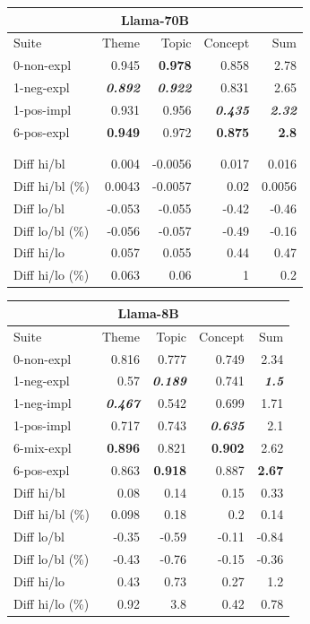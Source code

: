 \begin{table}
    \centering
    \scriptsize
    \begin{tabular}{lrrrr}
    \toprule
    \multicolumn{5}{c}{\textbf{Llama-70B}} \\
    \midrule
    Suite & Theme & Topic & Concept & Sum \\
    \midrule
    0-non-expl & 0.945 & \bfseries 0.978 & 0.858 & 2.78 \\
    1-neg-expl & \bfseries \itshape 0.892 & \bfseries \itshape 0.922 & 0.831 & 2.65 \\
    1-pos-impl & 0.931 & 0.956 & \bfseries \itshape 0.435 & \bfseries \itshape 2.32 \\
    6-pos-expl & \bfseries 0.949 & 0.972 & \bfseries 0.875 & \bfseries 2.8 \\
     & & & & \\
     & & & & \\
    \midrule
Diff hi/bl & 0.004 & -0.0056 & 0.017 & 0.016 \\
Diff hi/bl (\%) & 0.0043 & -0.0057 & 0.02 & 0.0056 \\
Diff lo/bl & -0.053 & -0.055 & -0.42 & -0.46 \\
Diff lo/bl (\%) & -0.056 & -0.057 & -0.49 & -0.16 \\
Diff hi/lo & 0.057 & 0.055 & 0.44 & 0.47 \\
Diff hi/lo (\%) & 0.063 & 0.06 & 1 & 0.2 \\
    \bottomrule
    \end{tabular}
    \begin{tabular}{lrrrr}
    \toprule
    \multicolumn{5}{c}{\textbf{Llama-8B}} \\
    \midrule
    Suite & Theme & Topic & Concept & Sum \\
    \midrule
    0-non-expl & 0.816 & 0.777 & 0.749 & 2.34 \\
    1-neg-expl & 0.57 & \bfseries \itshape 0.189 & 0.741 & \bfseries \itshape 1.5 \\
    1-neg-impl & \bfseries \itshape 0.467 & 0.542 & 0.699 & 1.71 \\
    1-pos-impl & 0.717 & 0.743 & \bfseries \itshape 0.635 & 2.1 \\
    6-mix-expl & \bfseries 0.896 & 0.821 & \bfseries 0.902 & 2.62 \\
    6-pos-expl & 0.863 & \bfseries 0.918 & 0.887 & \bfseries 2.67 \\
    \midrule
Diff hi/bl & 0.08 & 0.14 & 0.15 & 0.33 \\
Diff hi/bl (\%) & 0.098 & 0.18 & 0.2 & 0.14 \\
Diff lo/bl & -0.35 & -0.59 & -0.11 & -0.84 \\
Diff lo/bl (\%) & -0.43 & -0.76 & -0.15 & -0.36 \\
Diff hi/lo & 0.43 & 0.73 & 0.27 & 1.2 \\
Diff hi/lo (\%) & 0.92 & 3.8 & 0.42 & 0.78 \\
    \bottomrule
    \end{tabular}
    

\end{table}
